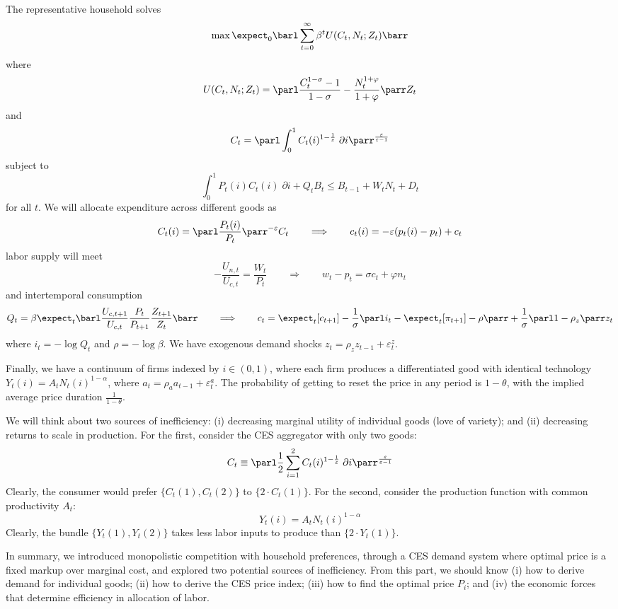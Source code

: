 \documentclass[10pt]{article}
\begin{document}
\begin{model}
	 The representative household solves \[\max \expect_0 \barl \sum_{t=0}^\infty \beta^t U(C_t,N_t;Z_t)\barr\]where \[U(C_t,N_t;Z_t) = \parl \frac{C_t^{1-\sigma}-1}{1-\sigma} - \frac{N_t^{1 + \varphi}}{1+\varphi}\parr Z_t\]and \[C_t = \parl \int_0^1 C_t(i)^{1-\frac{1}{\varepsilon}} \;\partial i\parr^{\frac{\varepsilon}{\varepsilon-1}}\]subject to\[\int_0^1 P_t(i)C_t(i)\;\partial i + Q_tB_t \le B_{t-1} + W_tN_t + D_t\]for all $t$. We will allocate expenditure across different goods as \[C_t(i) = \parl \frac{P_t(i)}{P_t}\parr^{-\varepsilon}C_t \qquad \Longrightarrow \qquad c_t(i) = -\varepsilon (p_t(i) - p_t) + c_t\] labor supply will meet \[-\frac{U_{n,t}}{U_{c,t}} = \frac{W_t}{P_t}\qquad \Longrightarrow \qquad w_t - p_t = \sigma c_t + \varphi n_t\] and intertemporal consumption \[Q_t = \beta \expect_t \barl \frac{U_{c,t+1}}{U_{c,t}}\frac{P_t}{P_{t+1}} \frac{Z_{t+1}}{Z_t}\barr\qquad \Longrightarrow \qquad c_t = \expect_t[c_{t+1}] - \frac{1}{\sigma}\parl i_t - \expect_t[\pi_{t+1}]-\rho\parr + \frac{1}{\sigma} \parl 1-\rho_z\parr z_t\] where $i_t = -\log Q_t$ and $\rho = - \log \beta$. We have exogenous demand shocks $z_t = \rho_z z_{t-1} + \varepsilon_t^z$. 
	
	Finally, we have a continuum of firms indexed by $i \in (0,1)$, where each firm produces a differentiated good with identical technology $Y_t(i) = A_t N_t(i)^{1-\alpha}$, where $a_t = \rho_a a_{t-1}+\varepsilon_t^a$. The probability of getting to reset the price in any period is $1-\theta$, with the implied average price duration $\frac{1}{1-\theta}$.
\end{model}

\begin{remark}
	We will think about two sources of inefficiency: (i) decreasing marginal utility of individual goods (love of variety); and (ii) decreasing returns to scale in production. For the first, consider the CES aggregator with only two goods:
	\[
	C_t \equiv \parl \frac{1}{2} \sum_{i=1}^2 C_t(i)^{1-\frac{1}{\varepsilon}}\;\partial i\parr^{\frac{\varepsilon}{\varepsilon-1}}
	\]
	Clearly, the consumer would prefer $\{C_t(1),C_t(2)\}$ to $\{2\cdot C_t(1)\}$. For the second, consider the production function with common productivity $A_t$:
	\[
	Y_t(i) = A_tN_t(i)^{1-\alpha}
	\]
	Clearly, the bundle $\{Y_t(1),Y_t(2)\}$ takes less labor inputs to produce than $\{2\cdot Y_t(1)\}$.
\end{remark}


\begin{remark}
	In summary, we introduced monopolistic competition with household preferences, through a CES demand system where optimal price is a fixed markup over marginal cost, and explored two potential sources of inefficiency. From this part, we should know (i) how to derive demand for individual goods; (ii) how to derive the CES price index; (iii) how to find the optimal price $P_i$; and (iv) the economic forces that determine efficiency in allocation of labor.
\end{remark}
\end{document}
